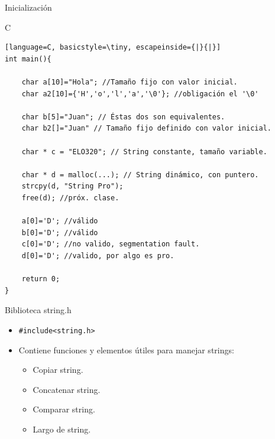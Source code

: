 \documentclass{beamer}
\begin{document}
\begin{frame}[fragile]{Inicialización}
\begin{exampleblock}{C}
\begin{lstlisting}[language=C, basicstyle=\tiny, escapeinside={|}{|}]
int main(){

	char a[10]="Hola"; //Tamaño fijo con valor inicial.
	char a2[10]={'H','o','l','a','\0'}; //obligación el '\0'

	char b[5]="Juan"; // Éstas dos son equivalentes.
	char b2[]="Juan" // Tamaño fijo definido con valor inicial.
	
	char * c = "ELO320"; // String constante, tamaño variable. 

	char * d = malloc(...); // String dinámico, con puntero.
	strcpy(d, "String Pro");
	free(d); //próx. clase. 	

	a[0]='D'; //válido
	b[0]='D'; //válido
	c[0]='D'; //no valido, segmentation fault.
	d[0]='D'; //valido, por algo es pro.

	return 0;
}

\end{lstlisting}
\end{exampleblock}
\end{frame}

\begin{frame}[fragile]{Biblioteca string.h}
\begin{itemize}
	\item \verb+#include<string.h>+
	\item Contiene funciones y elementos útiles para manejar strings:
	\begin{itemize}
	\item Copiar string.
	\item Concatenar string.
	\item Comparar string.
	\item Largo de string.
	\end{itemize}
\end{itemize}
\end{frame}
\end{document}
